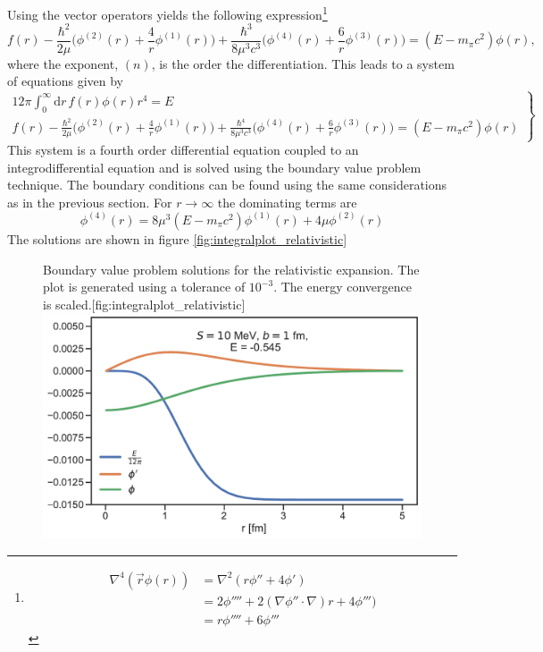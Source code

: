  Using the vector operators yields the following expression\footnote{\begin{align*}
     \nabla^4(\vec{r}\phi(r))&=\nabla^2(r\phi''+4\phi') \\
     &= 2\phi''''+2(\nabla\phi''\cdot\nabla)r+4\phi''') \\
     &=r\phi''''+6\phi'''
 \end{align*}}
 \begin{equation}
    f(r)-\frac{\hbar^2}{2\mu}\bigg( \phi^{(2)}(r)+\frac{4}{r}\phi^{(1)}(r) \bigg)+\frac{\hbar^3}{8\mu^3 c^3}\bigg(\phi^{(4)}(r)+\frac{6}{r}\phi^{(3)}(r)\bigg)=(E-m_\pi c^2)\phi(r),
 \end{equation}
 where the exponent, $(n)$, is the order the differentiation. This leads to a system of equations given by
 \begin{equation} \label{systemrel}
 \left.
    \begin{array}{ll}
            12\pi \int_0^\infty  \text{d}r \, f(r) \phi(r) r^4  = E \\
               f(r)-\frac{\hbar^2}{2\mu}\big( \phi^{(2)}(r)+\frac{4}{r}\phi^{(1)}(r) \big)+\frac{\hbar^4}{8\mu^3 c^3}\big(\phi^{(4)}(r)+\frac{6}{r}\phi^{(3)}(r)\big)=(E-m_\pi c^2)\phi(r)
    \end{array}
\right \} 
\end{equation}
This system is a fourth order differential equation coupled to an integrodifferential equation and is solved using the boundary value problem technique. The boundary conditions can be found using the same considerations as in the previous section. For $r\rightarrow \infty$ the dominating terms are 
\begin{equation}
    \phi^{(4)}(r) = 8\mu^3(E-m_\pi c^2) \phi^{(1)}(r)+4\mu \phi^{(2)}(r)
\end{equation}
The solutions are shown in figure \ref{fig:integralplot_relativistic}
\begin{figure}[H]
    \begin{sidecaption}{Boundary value problem solutions for the relativistic expansion. The plot is generated using a tolerance of $10^{-3}$. The energy convergence is scaled.}[fig:integralplot_relativistic]
    \includegraphics[width=\linewidth]{Figures/Integralplot_relativistic.pdf}
    \end{sidecaption}
\end{figure}
